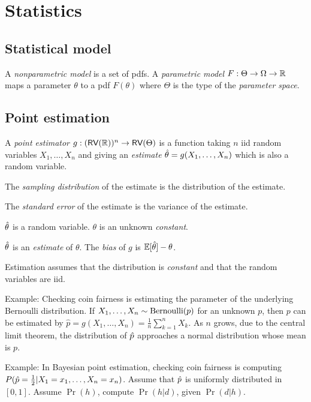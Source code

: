 \chapter{Statistics}

\section{Statistical model}

%
%
A \emph{nonparametric model} is a set of pdfs.
%
%
%
A \emph{parametric model} \(F : \Theta \to \Omega \to \mathbb{R}\)
maps a parameter \(\theta\)
to a pdf \(F(\theta)\)
where \(\Theta\) is the type of the \emph{parameter space}.

\section{Point estimation}

%
%
A \emph{point estimator} \(g : (\textsf{RV}(\mathbb{R}))^n \to \textsf{RV}(\Theta)\)
is a function taking \(n\) iid random variables \(X_1, \ldots, X_n\)
and giving an \emph{estimate} \(\hat{\theta} = g(X_1,\ldots,X_n)\) which is also a random variable.

The \emph{sampling distribution} of the estimate is the distribution of the estimate.

The \emph{standard error} of the estimate is the variance of the estimate.

\(\hat{\theta}\) is a random variable.
\(\theta\) is an unknown \emph{constant}.

%
\(\hat{\theta}\) is an \emph{estimate} of \(\theta\).
The \emph{bias} of \(g\) is \(\mathbb{E}[\hat{\theta}] - \theta\).

Estimation assumes that the distribution is \emph{constant} and
that the random variables are iid.

Example:
Checking coin fairness is estimating the parameter of the underlying Bernoulli distribution.
If \(X_1, \ldots, X_n \sim \text{Bernoulli}(p)\) for an unknown \(p\),
then \(p\) can be estimated by \(\hat{p} = g(X_1,\ldots,X_n) = \frac{1}{n} \sum_{k=1}^n X_k\).
As \(n\) grows,
due to the central limit theorem,
the distribution of \(\hat{p}\) approaches
a normal distribution whose mean is \(p\).

Example:
In Bayesian point estimation,
checking coin fairness is computing \(P(\hat{p} = \frac{1}{2} | X_1 = x_1, \ldots, X_n = x_n)\).
Assume that \(\hat{p}\) is uniformly distributed in \([0,1]\).
Assume \(\Pr(h)\), compute \(\Pr(h|d)\), given \(\Pr(d|h)\).

